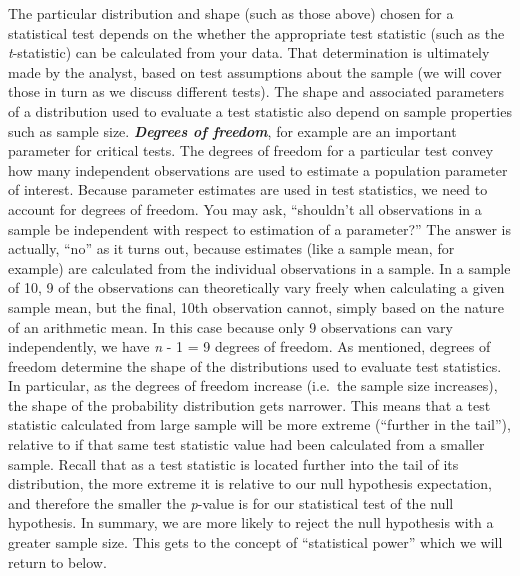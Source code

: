 \documentclass[]{book}
\begin{document}
The particular distribution and shape (such as those above) chosen for a statistical test depends on the whether the appropriate test statistic (such as the \emph{t}-statistic) can be calculated from your data. That determination is ultimately made by the analyst, based on test assumptions about the sample (we will cover those in turn as we discuss different tests). The shape and associated parameters of a distribution used to evaluate a test statistic also depend on sample properties such as sample size. \textbf{\emph{Degrees of freedom}}, for example are an important parameter for critical tests. The degrees of freedom for a particular test convey how many independent observations are used to estimate a population parameter of interest. Because parameter estimates are used in test statistics, we need to account for degrees of freedom. You may ask, ``shouldn't all observations in a sample be independent with respect to estimation of a parameter?'' The answer is actually, ``no'' as it turns out, because estimates (like a sample mean, for example) are calculated from the individual observations in a sample. In a sample of 10, 9 of the observations can theoretically vary freely when calculating a given sample mean, but the final, 10th observation cannot, simply based on the nature of an arithmetic mean. In this case because only 9 observations can vary independently, we have \emph{n} - 1 = 9 degrees of freedom. As mentioned, degrees of freedom determine the shape of the distributions used to evaluate test statistics. In particular, as the degrees of freedom increase (i.e.~the sample size increases), the shape of the probability distribution gets narrower. This means that a test statistic calculated from large sample will be more extreme (``further in the tail''), relative to if that same test statistic value had been calculated from a smaller sample. Recall that as a test statistic is located further into the tail of its distribution, the more extreme it is relative to our null hypothesis expectation, and therefore the smaller the \emph{p}-value is for our statistical test of the null hypothesis. In summary, we are more likely to reject the null hypothesis with a greater sample size. This gets to the concept of ``statistical power'' which we will return to below.
\end{document}
